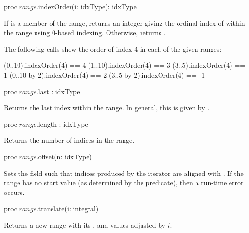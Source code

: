 \begin{protohead}
proc $range$.indexOrder(i: idxType): idxType
\end{protohead}
\begin{protobody}
If  is a member of the range, returns an integer giving
the ordinal index of  within the range using 0-based indexing.
Otherwise, returns .
\end{protobody}

\begin{example}
The following calls show the order of index 4 in each of the given
ranges:
\begin{chapel}
(0..10).indexOrder(4) == 4
(1..10).indexOrder(4) == 3
(3..5).indexOrder(4) == 1
(0..10 by 2).indexOrder(4) == 2
(3..5 by 2).indexOrder(4) == -1
\end{chapel}
\end{example}
\begin{protohead}

proc $range$.last : idxType
\end{protohead}
\begin{protobody}
Returns the last index within the range.  In general, this is given
by .
\end{protobody}

\begin{protohead}
proc $range$.length : idxType
\end{protohead}
\begin{protobody}
Returns the number of indices in the range.
\end{protobody}

\label{Range_Offset_Method}
\begin{protohead}
proc $range$.offset(n: idxType)
\end{protohead}
\begin{protobody}
Sets the  field such that indices produced by the iterator are
aligned with .  If the range has no start value (as determined
by the  predicate), then a run-time error occurs.
\end{protobody}

\begin{protohead}
proc $range$.translate(i: integral)
\end{protohead}
\begin{protobody}
Returns a new range with its ,  and  values
adjusted by $i$.
\end{protobody}

